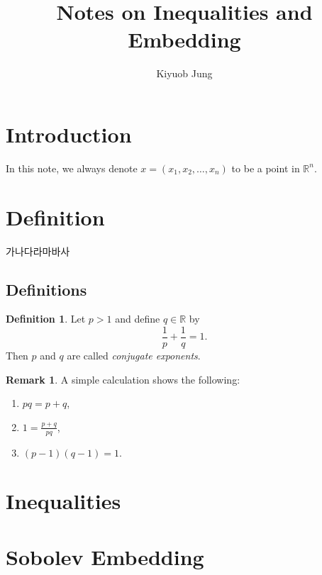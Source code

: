 \documentclass[a4paper,11pt]{article}
\title{
Notes on Inequalities and Embedding}
\author{
Kiyuob Jung}
\theoremstyle{definition}
\newtheorem{definition}[theorem]{Definition}
\newtheorem{remark}[theorem]{Remark}
\begin{document}
\date{}
\maketitle



\section{Introduction}

In this note, we always denote $x=(x_1, x_2, \ldots, x_n)$ to be a point in $\mathbb{R}^{n}$.

\section{Definition}

가나다라마바사

\subsection{Definitions}

\begin{definition}
    Let $p>1$ and define $q \in \mathbb{R}$ by 
    \begin{equation*} 
        \frac{1}{p} + \frac{1}{q} = 1.
    \end{equation*}
    Then $p$ and $q$ are called \emph{conjugate exponents}.
\end{definition}

\begin{remark}
    A simple calculation shows the following:
    \begin{enumerate}[label=(\roman*)] 
    \rm\item $pq = p + q$,
    \rm\item $\displaystyle 1 = \frac{p+q}{pq}$,
    \rm\item $(p-1)(q-1)=1$.
    \end{enumerate}
\end{remark}

\section{Inequalities}

\section{Sobolev Embedding}
\end{document}
